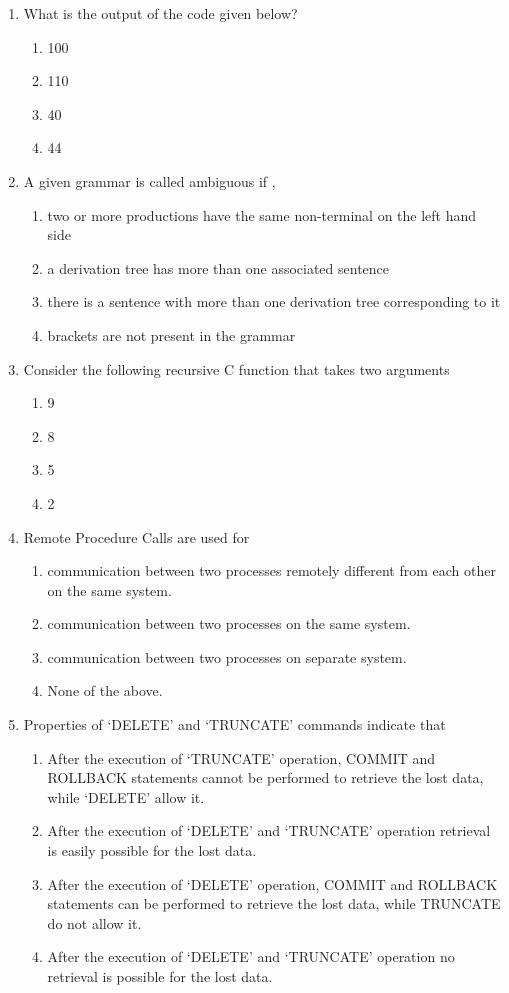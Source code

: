 \documentclass[12pt]{article}
\begin{document}
\begin{enumerate}
\item[66.] What is the output of the code given below?
\begin{enumerate}[label=\Alph*.]
  \item 100
  \item 110
  \item 40
  \item 44
\end{enumerate}

\item[67.] A given grammar is called ambiguous if ,
\begin{enumerate}[label=\Alph*.]
  \item two or more productions have the same non-terminal on the left hand side
  \item a derivation tree has more than one associated sentence
  \item there is a sentence with more than one derivation tree corresponding to it
  \item brackets are not present in the grammar
\end{enumerate}

\item[68.] Consider the following recursive C function that takes two arguments
\begin{enumerate}[label=\Alph*.]
  \item 9
  \item 8
  \item 5
  \item 2
\end{enumerate}

\item[69.] Remote Procedure Calls are used for
\begin{enumerate}[label=\Alph*.]
  \item communication between two processes remotely different from each other on the same system.
  \item communication between two processes on the same system.
  \item communication between two processes on separate system.
  \item None of the above.
\end{enumerate}

\item[70.] Properties of ‘DELETE’ and ‘TRUNCATE’ commands indicate that
\begin{enumerate}[label=\Alph*.]
  \item After the execution of ‘TRUNCATE’ operation, COMMIT and ROLLBACK statements cannot be performed to retrieve the lost data, while ‘DELETE’ allow it.
  \item After the execution of ‘DELETE’ and ‘TRUNCATE’ operation retrieval is easily possible for the lost data.
  \item After the execution of ‘DELETE’ operation, COMMIT and ROLLBACK statements can be performed to retrieve the lost data, while TRUNCATE do not allow it.
  \item After the execution of ‘DELETE’ and ‘TRUNCATE’ operation no retrieval is possible for the lost data.
\end{enumerate}


\end{enumerate}
\end{document}
